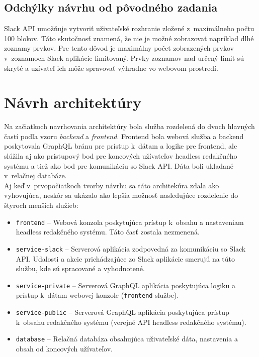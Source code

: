 \subsection{Odchýlky návrhu od pôvodného zadania}
Slack API umožňuje vytvoriť uživateľské rozhranie zložené z~maximálneho počtu 100 blokov. Táto skutočnosť znamená, že nie je možné zobrazovať napríklad dlhé zoznamy prvkov. Pre tento dôvod je maximálny počet zobrazených prvkov v~zoznamoch Slack aplikácie limitovaný. Prvky zoznamov nad určený limit sú skryté a uzívateľ ich môže spravovať výhradne vo webovom prostredí. 

\section{Návrh architektúry}
\label{design:architecture}
Na začiatkoch navrhovania architektúry bola služba rozdelená do dvoch hlavných častí podľa vzoru \emph{backend} a \emph{frontend}. Frontend bola webová služba a backend poskytovala GraphQL bránu pre prístup k~dátam a logike pre frontend, ale slúžila aj ako prístupový bod pre koncových užívateľov headless redakčného systému a tiež ako bod pre komunikáciu so Slack API. Dáta boli ukladané v~relačnej databáze. \\

\noindent Aj keď v~prvopočiatkoch tvorby návrhu sa táto architekúra zdala ako vyhovujúca, neskôr sa ukázalo ako lepšia možnosť nasledujúce rozdelenie do štyroch menších služieb:

\begin{itemize}
	\item \texttt{frontend} -- Webová konzola poskytujúca prístup k~obsahu a nastaveniam headless redakčného systému. Táto časť zostala nezmenená.
	\item \texttt{service-slack} -- Serverová aplikácia zodpovedná za komunikáciu so Slack API. Udalosti a akcie prichádzajúce zo Slack aplikácie smerujú na túto službu, kde sú spracované a vyhodnotené.
	\item \texttt{service-private} -- Serverová GraphQL aplikácia poskytujúca logiku a prístup k~dátam webovej konzole (\texttt{frontend} službe).
	\item \texttt{service-public} -- Serverová GraphQL aplikácia poskytujúca prístup k~obsahu redakčného systému (verejné API headless redakčného systému).
	\item \texttt{database} -- Relačná databáza obsahujúca uživateľské dáta, nastavenia a obsah od koncových užívateľov.
\end{itemize}

